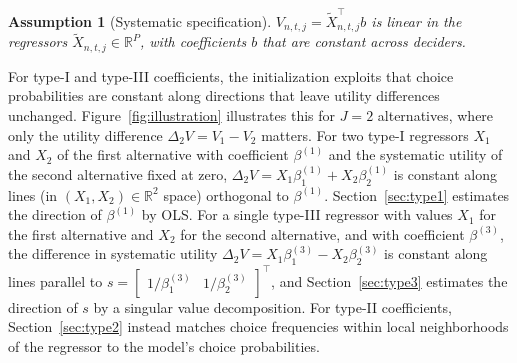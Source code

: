 \documentclass[preprint,12pt,authoryear]{elsarticle}
\DeclareRobustCommand{\asmstar}[1]{#1\textsuperscript{$\ast$}}
\newcommand{\assumptionvarname}{}
\newtheorem*{assumptionvarthm}{Assumption \assumptionvarname}
\newenvironment{assumptionvar}[1]{\renewcommand{\assumptionvarname}{#1}\begin{assumptionvarthm}}{\end{assumptionvarthm}}
\newcommand{\R}{\mathbb{R}}
\begin{document}
\begin{assumptionvar}{\asmstar{2}}[Systematic specification]
$V_{n,t,j} = \tilde X_{n,t,j}^\top b$ is linear in the regressors $\tilde X_{n,t,j} \in \R^{P}$, with coefficients $b$ that are constant across deciders.
\end{assumptionvar}

For type-I and type-III coefficients, the initialization exploits that choice probabilities are constant along directions that leave utility differences unchanged. Figure~\ref{fig:illustration} illustrates this for $J = 2$ alternatives, where only the utility difference $\Delta_2 V = V_1 - V_2$ matters. For two \mbox{type-I} regressors $X_1$ and $X_2$ of the first alternative with coefficient $\beta^{(1)}$ and the systematic utility of the second alternative fixed at zero, $\Delta_2 V = X_1 \beta^{(1)}_1 + X_2 \beta^{(1)}_2$ is constant along lines (in $(X_1,X_2) \in \R^2$ space) orthogonal to $\beta^{(1)}$. Section~\ref{sec:type1} estimates the direction of $\beta^{(1)}$ by OLS. For a single type-III regressor with values $X_1$ for the first alternative and $X_2$ for the second alternative, and with coefficient $\beta^{(3)}$, the difference in systematic utility $\Delta_2 V = X_1 \beta^{(3)}_1 - X_2 \beta^{(3)}_2$ is constant along lines parallel to $s = \begin{bmatrix} 1/\beta^{(3)}_1 & 1/\beta^{(3)}_2 \end{bmatrix}^\top$, and Section~\ref{sec:type3} estimates the direction of $s$ by a singular value decomposition. For type-II coefficients, Section~\ref{sec:type2} instead matches choice frequencies within local neighborhoods of the regressor to the model's choice probabilities.
\end{document}
